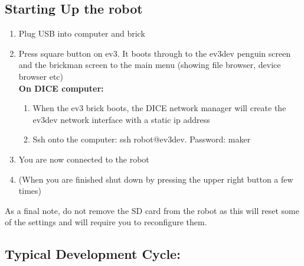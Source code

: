 \documentclass{article}
\begin{document}
  \subsection{Starting Up the robot}
  \begin{enumerate}
      \item Plug USB into computer and brick 
      \item Press square button on ev3. It boots through to the ev3dev penguin screen and the 
          brickman screen to the main menu (showing file browser, device browser etc) \\
          \textbf{On DICE computer:} 
          \begin{enumerate}
              \item When the ev3 brick boots, the DICE network manager will create the ev3dev 
  network interface with a static ip address
              \item Ssh onto the computer: ssh robot@ev3dev. Password: maker 
          \end{enumerate}
      \item You are now connected to the robot 
      \item (When you are finished shut down by pressing the upper right button a few times)
  \end{enumerate}
   
  As a final note, do not remove the SD card from the robot as this will reset some of the settings 
  and will require you to reconfigure them.

  \subsection{Typical Development Cycle:}
\end{document}
